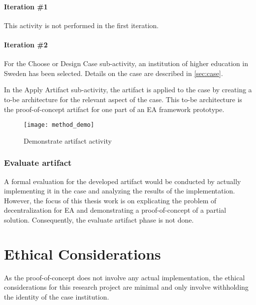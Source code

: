 \paragraph{Iteration \#1}

This activity is not performed in the first iteration. 

\paragraph{Iteration \#2}
For the Choose or Design Case sub-activity, an institution of higher education in Sweden has been selected. Details on the case are described in \ref{sec:case}.

In the Apply Artifact sub-activity, the artifact is applied to the case by creating a to-be architecture for the relevant aspect of the case. This to-be architecture is the proof-of-concept artifact for one part of an EA framework prototype.


\begin{figure}
\centering
\texttt{[image: method\_demo]}
\caption{Demonstrate artifact activity}
\label{fig:method_demo}
\end{figure}

\subsubsection*{Evaluate artifact}

A formal evaluation for the developed artifact would be conducted by actually implementing it in the case and analyzing the results of the implementation. However, the focus of this thesis work is on explicating the problem of decentralization for EA and demonstrating a proof-of-concept of a partial solution. Consequently, the evaluate artifact phase is not done. 

\section{Ethical Considerations}

As the proof-of-concept does not involve any actual implementation, the ethical considerations for this research project are minimal and only involve withholding the identity of the case institution. 
